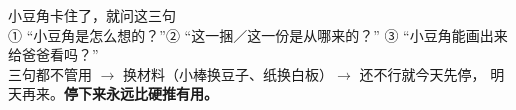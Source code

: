 \begin{center}
\begin{tcolorbox}[enhanced,colback=white,colframe=passc,boxrule=1.2pt,
                  arc=2mm,width=16.6cm,left=10pt,right=10pt,top=8pt,bottom=8pt]
\begin{center}
{\heiti\large 小豆角卡住了，就问这三句}\\[4pt]
{\kaishu ① “小豆角是怎么想的？”\quad ② “这一捆／这一份是从哪来的？”\quad
③ “小豆角能画出来给爸爸看吗？”}\\[3pt]
{\small 三句都不管用 $\to$ 换材料（小棒换豆子、纸换白板）$\to$ 还不行就今天先停，
明天再来。\textbf{停下来永远比硬推有用。}}
\end{center}
\end{tcolorbox}
\end{center}
